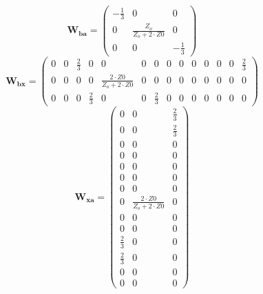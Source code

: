 \[ \mathbf{W_{ba}} = \left(\begin{smallmatrix} -\frac{1}{3} & 0 & 0 \\ 0 & \frac{Z_o}{Z_o+2\cdot Z0} & 0 \\ 0 & 0 & -\frac{1}{3} \end{smallmatrix}\right) \]
\[ \mathbf{W_{bx}} = \left(\begin{smallmatrix} 0 & 0 & \frac{2}{3} & 0 & 0 & 0 & 0 & 0 & 0 & 0 & 0 & 0 & 0 & \frac{2}{3} \\ 0 & 0 & 0 & 0 & \frac{2\cdot Z0}{Z_o+2\cdot Z0} & 0 & 0 & 0 & 0 & 0 & 0 & 0 & 0 & 0 \\ 0 & 0 & 0 & \frac{2}{3} & 0 & 0 & \frac{2}{3} & 0 & 0 & 0 & 0 & 0 & 0 & 0 \end{smallmatrix}\right) \]
\[ \mathbf{W_{xa}} = \left(\begin{smallmatrix} 0 & 0 & \frac{2}{3} \\ 0 & 0 & \frac{2}{3} \\ 0 & 0 & 0 \\ 0 & 0 & 0 \\ 0 & 0 & 0 \\ 0 & 0 & 0 \\ 0 & 0 & 0 \\ 0 & \frac{2\cdot Z0}{Z_o+2\cdot Z0} & 0 \\ 0 & 0 & 0 \\ 0 & 0 & 0 \\ \frac{2}{3} & 0 & 0 \\ \frac{2}{3} & 0 & 0 \\ 0 & 0 & 0 \\ 0 & 0 & 0 \end{smallmatrix}\right) \]
